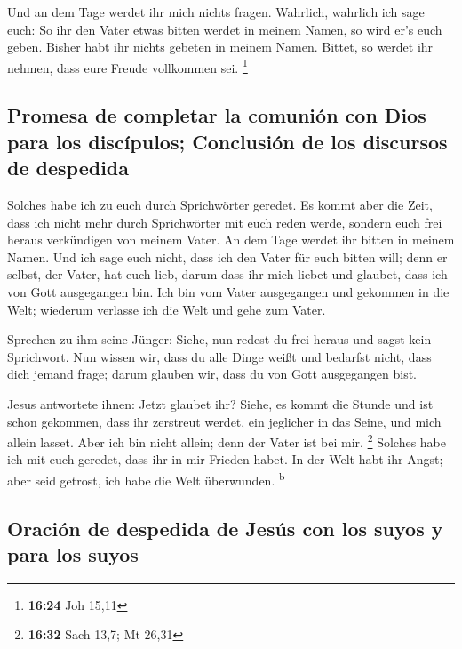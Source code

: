 Und an dem Tage werdet ihr mich nichts fragen. Wahrlich,
wahrlich ich sage euch: So ihr den Vater etwas bitten werdet in meinem
Namen, so wird er's euch geben.  Bisher habt ihr nichts
gebeten in meinem Namen. Bittet, so werdet ihr nehmen, dass eure Freude
vollkommen sei. \footnote{\textbf{16:24} Joh 15,11}

\hypertarget{promesa-de-completar-la-comuniuxf3n-con-dios-para-los-discuxedpulos-conclusiuxf3n-de-los-discursos-de-despedida}{%
\subsection{Promesa de completar la comunión con Dios para los
discípulos; Conclusión de los discursos de
despedida}\label{promesa-de-completar-la-comuniuxf3n-con-dios-para-los-discuxedpulos-conclusiuxf3n-de-los-discursos-de-despedida}}

 Solches habe ich zu euch durch Sprichwörter geredet. Es
kommt aber die Zeit, dass ich nicht mehr durch Sprichwörter mit euch
reden werde, sondern euch frei heraus verkündigen von meinem Vater.
 An dem Tage werdet ihr bitten in meinem Namen. Und ich
sage euch nicht, dass ich den Vater für euch bitten will;
 denn er selbst, der Vater, hat euch lieb, darum dass ihr
mich liebet und glaubet, dass ich von Gott ausgegangen bin.
 Ich bin vom Vater ausgegangen und gekommen in die Welt;
wiederum verlasse ich die Welt und gehe zum Vater.

 Sprechen zu ihm seine Jünger: Siehe, nun redest du frei
heraus und sagst kein Sprichwort.  Nun wissen wir, dass
du alle Dinge weißt und bedarfst nicht, dass dich jemand frage; darum
glauben wir, dass du von Gott ausgegangen bist.

 Jesus antwortete ihnen: Jetzt glaubet ihr?
 Siehe, es kommt die Stunde und ist schon gekommen, dass
ihr zerstreut werdet, ein jeglicher in das Seine, und mich allein
lasset. Aber ich bin nicht allein; denn der Vater ist bei mir.
\footnote{\textbf{16:32} Sach 13,7; Mt 26,31}  Solches
habe ich mit euch geredet, dass ihr in mir Frieden habet. In der Welt
habt ihr Angst; aber seid getrost, ich habe die Welt überwunden.
\textsuperscript{b}

\hypertarget{oraciuxf3n-de-despedida-de-jesuxfas-con-los-suyos-y-para-los-suyos}{%
\subsection{Oración de despedida de Jesús con los suyos y para los
suyos}\label{oraciuxf3n-de-despedida-de-jesuxfas-con-los-suyos-y-para-los-suyos}}

